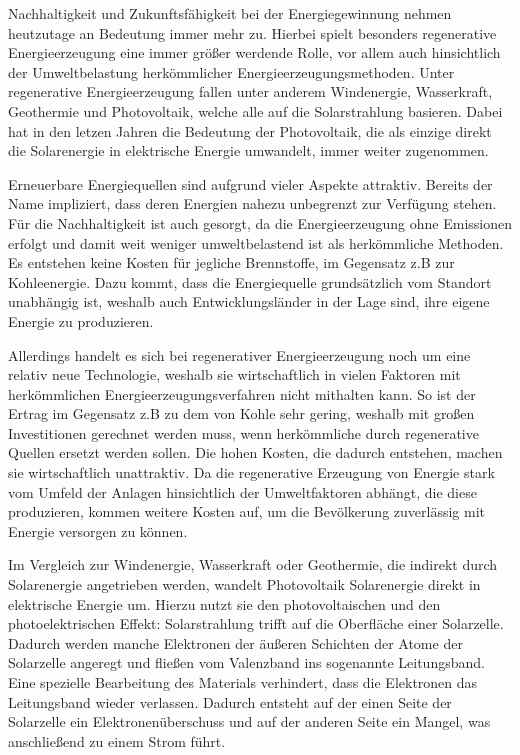 \par Nachhaltigkeit und Zukunftsfähigkeit bei der Energiegewinnung nehmen heutzutage an Bedeutung immer mehr zu. Hierbei spielt besonders regenerative Energieerzeugung eine immer größer werdende Rolle, vor allem auch hinsichtlich der Umweltbelastung herkömmlicher Energieerzeugungsmethoden. Unter regenerative Energieerzeugung fallen unter anderem Windenergie, Wasserkraft, Geothermie und Photovoltaik, welche alle auf die Solarstrahlung basieren. Dabei hat in den letzen Jahren die Bedeutung der Photovoltaik, die als einzige direkt die Solarenergie in elektrische Energie umwandelt, immer weiter zugenommen.
\par Erneuerbare Energiequellen sind aufgrund vieler Aspekte attraktiv. Bereits der Name impliziert, dass deren Energien nahezu unbegrenzt zur Verfügung stehen. Für die Nachhaltigkeit ist auch gesorgt, da die Energieerzeugung ohne Emissionen erfolgt und damit weit weniger umweltbelastend ist als herkömmliche Methoden. Es entstehen keine Kosten für jegliche Brennstoffe, im Gegensatz z.B zur Kohleenergie. Dazu kommt, dass die Energiequelle grundsätzlich vom Standort unabhängig ist, weshalb auch Entwicklungsländer in der Lage sind, ihre eigene Energie zu produzieren.
\par Allerdings handelt es sich bei regenerativer Energieerzeugung noch um eine relativ neue Technologie, weshalb sie wirtschaftlich in vielen Faktoren mit herkömmlichen Energieerzeugungsverfahren nicht mithalten kann. So ist der Ertrag im Gegensatz z.B zu dem von Kohle sehr gering, weshalb mit großen Investitionen gerechnet werden muss, wenn herkömmliche durch regenerative Quellen ersetzt werden sollen. Die hohen Kosten, die dadurch entstehen, machen sie wirtschaftlich unattraktiv. Da die regenerative Erzeugung von Energie stark vom Umfeld der Anlagen hinsichtlich der Umweltfaktoren abhängt, die diese produzieren, kommen weitere Kosten auf, um die Bevölkerung zuverlässig mit Energie versorgen zu können.
\par Im Vergleich zur Windenergie, Wasserkraft oder Geothermie, die indirekt durch Solarenergie angetrieben werden, wandelt Photovoltaik Solarenergie direkt in elektrische Energie um. Hierzu nutzt sie den photovoltaischen und den photoelektrischen Effekt: Solarstrahlung trifft auf die Oberfläche einer Solarzelle. Dadurch werden manche Elektronen der äußeren Schichten der Atome der Solarzelle angeregt und fließen vom Valenzband ins sogenannte Leitungsband. Eine spezielle Bearbeitung des Materials verhindert, dass die Elektronen das Leitungsband wieder verlassen. Dadurch entsteht auf der einen Seite der Solarzelle ein Elektronenüberschuss und auf der anderen Seite ein Mangel, was anschließend zu einem Strom führt.
